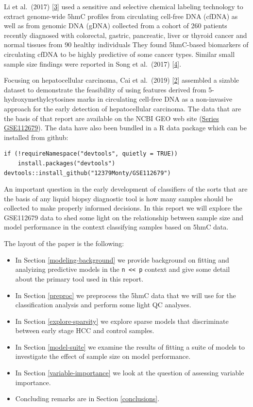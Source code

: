 \documentclass[
]{book}
\begin{document}
Li et al.~(2017) {[}\protect\hyperlink{ref-Li:2017aa}{3}{]} used a sensitive and selective chemical labeling technology
to extract genome-wide 5hmC profiles from circulating cell-free DNA (cfDNA)
as well as from genomic DNA (gDNA)
collected from a cohort of 260 patients recently diagnosed with colorectal,
gastric, pancreatic, liver or thyroid cancer and normal tissues from 90 healthy individuals
They found 5hmC-based biomarkers of circulating cfDNA to be highly predictive of some cancer types.
Similar small sample size findings were reported in Song et al.~(2017) {[}\protect\hyperlink{ref-Song:2017aa}{4}{]}.

Focusing on hepatocellular carcinoma, Cai et al.~(2019) {[}\protect\hyperlink{ref-Cai:2019aa}{2}{]} assembled a sizable dataset
to demonstrate the feasibility of using features derived from
5-hydroxymethylcytosines marks in circulating cell-free DNA as
a non-invasive approach for the early detection of
hepatocellular carcinoma. The data that are the basis of that
report are available on the NCBI GEO web site
(\href{https://www.ncbi.nlm.nih.gov/geo/query/acc.cgi?acc=GSE112679}{Series GSE112679}).
The data have also been bundled in a R data package which can be installed from github:

\begin{verbatim}
if (!requireNamespace("devtools", quietly = TRUE))
    install.packages("devtools")
devtools::install_github("12379Monty/GSE112679")
\end{verbatim}

An important question in the early development of classifiers of the sorts
that are the basis of any liquid biopsy diagnostic tool is how many samples
should be collected to make properly informed decisions. In this
report we will explore the GSE112679 data to shed some light on
the relationship between sample size and model performance
in the context classifying samples based on 5hmC data.

The layout of the paper is the following:

\begin{itemize}
\item
  In Section \ref{modeling-background} we provide background on fitting and
  analyizing predictive models in the \texttt{n\ \textless{}\textless{}\ p} context and
  give some detail about the primary tool used in this report.
\item
  In Section \ref{preproc} we preprocess the 5hmC data that
  we will use for the classification analysis and perform some light QC analyses.
\item
  In Section \ref{explore-sparsity} we explore sparse models
  that discriminate between early stage HCC and control samples.
\item
  In Section \ref{model-suite} we examine the results of fitting a suite of models to
  investigate the effect of sample size on model performance.
\item
  In Section \ref{variable-importance} we look at the question of assessing variable importance.
\item
  Concluding remarks are in Section \ref{conclusions}.
\end{itemize}
\end{document}
